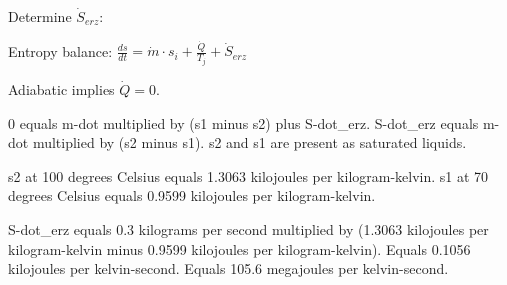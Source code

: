 Determine \( \dot{S}_{erz} \):  

Entropy balance:  
\( \frac{ds}{dt} = \dot{m} \cdot s_i + \frac{\dot{Q}}{T_j} + \dot{S}_{erz} \)  

Adiabatic implies \( \dot{Q} = 0 \).

0 equals m-dot multiplied by (s1 minus s2) plus S-dot_erz.  
S-dot_erz equals m-dot multiplied by (s2 minus s1).  
s2 and s1 are present as saturated liquids.  

s2 at 100 degrees Celsius equals 1.3063 kilojoules per kilogram-kelvin.  
s1 at 70 degrees Celsius equals 0.9599 kilojoules per kilogram-kelvin.  

S-dot_erz equals 0.3 kilograms per second multiplied by (1.3063 kilojoules per kilogram-kelvin minus 0.9599 kilojoules per kilogram-kelvin).  
Equals 0.1056 kilojoules per kelvin-second.  
Equals 105.6 megajoules per kelvin-second.